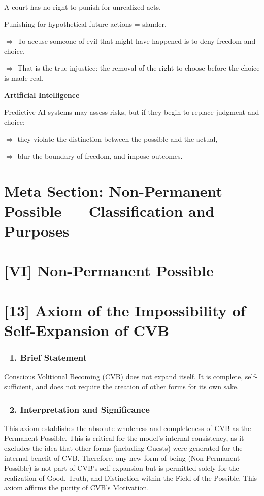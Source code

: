 \documentclass[12pt]{article}
\begin{document}
A court has no right to punish for unrealized acts.

Punishing for hypothetical future actions = slander.

$\Rightarrow$ To accuse someone of evil that might have happened is to deny freedom and choice.

$\Rightarrow$ That is the true injustice: the removal of the right to choose before the choice is made real.

\textbf{Artificial Intelligence}

Predictive AI systems may assess risks, but if they begin to replace judgment and choice:

$\Rightarrow$ they violate the distinction between the possible and the actual,

$\Rightarrow$ blur the boundary of freedom, and impose outcomes.





\section*{Meta Section: Non-Permanent Possible — Classification and Purposes}

\section*{[VI] Non-Permanent Possible}

\section*{[13] Axiom of the Impossibility of Self-Expansion of CVB}

\subsubsection*{🔹 1. Brief Statement}

Conscious Volitional Becoming (CVB) does not expand itself. It is complete, self-sufficient, and does not require the creation of other forms for its own sake.

\subsubsection*{🔹 2. Interpretation and Significance}

This axiom establishes the absolute wholeness and completeness of CVB as the Permanent Possible. This is critical for the model’s internal consistency, as it excludes the idea that other forms (including Guests) were generated for the internal benefit of CVB. Therefore, any new form of being (Non-Permanent Possible) is not part of CVB’s self-expansion but is permitted solely for the realization of Good, Truth, and Distinction within the Field of the Possible. This axiom affirms the purity of CVB’s Motivation.
\end{document}
